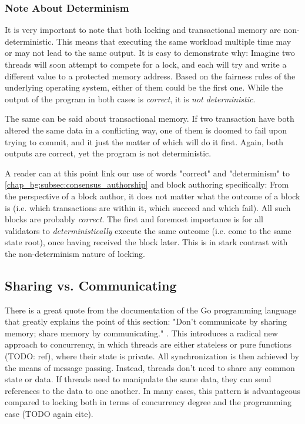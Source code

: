 \subsubsection{Note About Determinism}

It is very important to note that both locking and transactional memory are non-deterministic. This
means that executing the same workload multiple time may or may not lead to the same output. It is
easy to demonstrate why: Imagine two threads will soon attempt to compete for a lock, and each will
try and write a different value to a protected memory address. Based on the fairness rules of the
underlying operating system, either of them could be the first one. While the output of the program
in both cases is \textit{correct}, it is \textit{not deterministic}.

The same can be said about transactional memory. If two transaction have both altered the same data
in a conflicting way, one of them is doomed to fail upon trying to commit, and it just the matter of
which will do it first. Again, both outputs are correct, yet the program is not deterministic.

\begin{remark}
	A reader can at this point link our use of words "correct" and "determinism" to
	\ref{chap_bg:subsec:consensus_authorship} and block authoring specifically: From the perspective
	of a block author, it does not matter what the outcome of a block is (i.e. which transactions
	are within it, which succeed and which fail). All such blocks are probably \textit{correct}. The
	first and foremost importance is for all validators to \textit{deterministically} execute the
	same outcome (i.e. come to the same state root), once having received the block later. This is
	in stark contrast with the non-determinism nature of locking.
\end{remark}


\subsection{Sharing vs. Communicating}\label{chap_bg:subsec:sharing_communication}

There is a great quote from the documentation of the Go programming language that greatly explains
the point of this section: "Don't communicate by sharing memory; share memory by communicating."
\cite{ShareMemoryCommunicating}. This introduces a radical new approach to concurrency, in which
threads are either stateless or pure functions (TODO: ref), where their state is private. All
synchronization is then achieved by the means of message passing. Instead, threads don't need to
share any common state or data. If threads need to manipulate the same data, they can send
references to the data to one another. In many cases, this pattern is advantageous compared to
locking both in terms of concurrency degree and the programming ease (TODO again cite).

